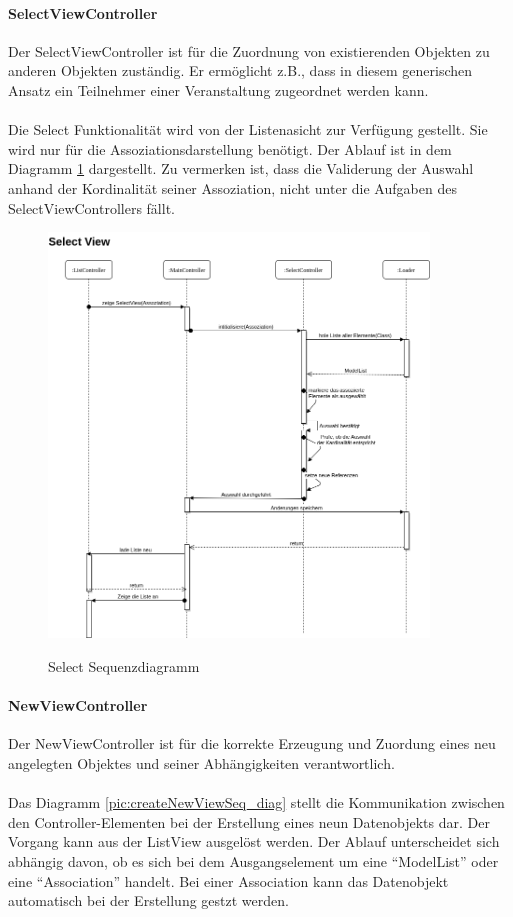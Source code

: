 \paragraph{SelectViewController}
Der SelectViewController ist für die Zuordnung von existierenden Objekten zu anderen Objekten zuständig. Er ermöglicht z.B.,
dass in diesem generischen Ansatz ein Teilnehmer einer Veranstaltung zugeordnet werden kann.\\
\\
Die Select Funktionalität wird von der Listenasicht zur Verfügung gestellt. Sie wird nur für die Assoziationsdarstellung benötigt. 
Der Ablauf ist in dem Diagramm \ref{pic:selectSeq_diag} dargestellt. Zu vermerken ist, dass die Validerung der Auswahl anhand der
Kordinalität seiner Assoziation, nicht unter die Aufgaben des SelectViewControllers fällt.  

\begin{figure}[htb!]
	\caption{Select Sequenzdiagramm}
	\includegraphics[width=0.9\textwidth]{content/pictures/SelectSeq}
	\label{pic:selectSeq_diag}
\end{figure}



\paragraph{NewViewController}
Der NewViewController ist für die korrekte Erzeugung und Zuordung eines neu angelegten Objektes und seiner Abhängigkeiten verantwortlich.
\\
\\
Das Diagramm \ref{pic:createNewViewSeq_diag} stellt die Kommunikation zwischen den Controller-Elementen bei der Erstellung eines neun
Datenobjekts dar. Der Vorgang kann aus der ListView ausgelöst werden. Der Ablauf unterscheidet sich abhängig davon, ob es sich bei
dem Ausgangselement um eine \enquote{ModelList} oder eine \enquote{Association} handelt. Bei einer Association kann das Datenobjekt automatisch bei der Erstellung gestzt
werden.

